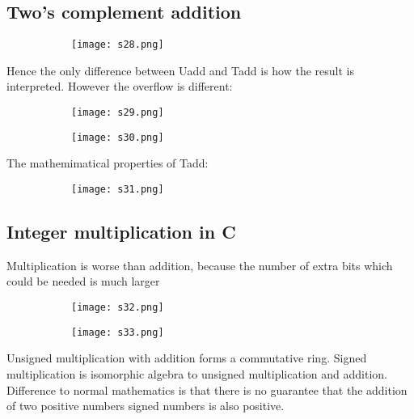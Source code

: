 \documentclass[8pt]{extreport}
\begin{document}
\subsection{Two's complement addition}
\begin{figure}[H]
\centering
\begin{subfigure}[b]{0.4\linewidth}
\texttt{[image: s28.png]}
\end{subfigure}
\end{figure}
Hence the only difference between Uadd and Tadd is how the result is interpreted. However the overflow is different:
\begin{figure}[H]
\centering
\begin{subfigure}[b]{0.4\linewidth}
\texttt{[image: s29.png]}
\end{subfigure}
\begin{subfigure}[b]{0.4\linewidth}
\texttt{[image: s30.png]}
\end{subfigure}
\end{figure}
The mathemimatical properties of Tadd:
\begin{figure}[H]
\centering
\begin{subfigure}[b]{0.4\linewidth}
\texttt{[image: s31.png]}
\end{subfigure}
\end{figure}

\subsection{Integer multiplication in C}
Multiplication is worse than addition, because the number of extra bits which could be needed is much larger

\begin{figure}[H]
\centering
\begin{subfigure}[b]{0.4\linewidth}
\texttt{[image: s32.png]}
\end{subfigure}
\begin{subfigure}[b]{0.4\linewidth}
\texttt{[image: s33.png]}
\end{subfigure}
\end{figure}
Unsigned multiplication with addition forms a commutative ring. Signed multiplication is isomorphic algebra to unsigned multiplication and addition. Difference to normal mathematics is that there is no guarantee that the addition of two positive numbers signed numbers is also positive. 
\end{document}
